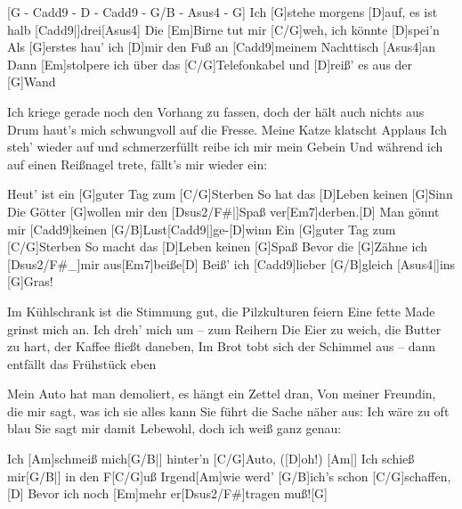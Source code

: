 


\begin{guitar}
	[G - Cadd9 - D - Cadd9 - G/B - Asus4 - G]{}
	Ich [G]stehe morgens [D]auf, es ist halb [Cadd9|]{drei}[Asus4]{}
	Die [Em]Birne tut mir [C/G]weh, ich könnte [D]spei'n
	Als [G]erstes hau' ich [D]mir den Fuß an [Cadd9]meinem Nachttisch [Asus4]an
	Dann [Em]stolpere ich über das [C/G]Telefonkabel und [D]reiß' es aus der [G]Wand
	
	Ich kriege gerade noch den Vorhang zu fassen, doch der hält auch nichts aus
	Drum haut's mich schwungvoll auf die Fresse. Meine Katze klatscht Applaus
	Ich steh' wieder auf und schmerzerfüllt reibe ich mir mein Gebein
	Und während ich auf einen Reißnagel trete, fällt's mir wieder ein:
	
	Heut' ist ein [G]guter Tag zum [C/G]Sterben
	So hat das [D]Leben keinen [G]Sinn
	Die Götter [G]wollen mir den [Dsus2/F#|]{Spaß} ver[Em7]derben.[D]{}
	Man gönnt mir [Cadd9]keinen [G/B]Lust[Cadd9|]{ge-}[D]winn
	Ein [G]guter Tag zum [C/G]Sterben
	So macht das [D]Leben keinen [G]Spaß
	Bevor die [G]Zähne ich [Dsus2/F#_]{mir aus}[Em7]beiße[D]{}
	Beiß' ich [Cadd9]lieber [G/B]gleich [Asus4|]{ins} [G]Gras!
	
	Im Kühlschrank ist die Stimmung gut, die Pilzkulturen feiern
	Eine fette Made grinst mich an. Ich dreh' mich um – zum Reihern
	Die Eier zu weich, die Butter zu hart, der Kaffee fließt daneben,
	Im Brot tobt sich der Schimmel aus – dann entfällt das Frühstück eben
	
	Mein Auto hat man demoliert, es hängt ein Zettel dran,
	Von meiner Freundin, die mir sagt, was ich sie alles kann
	Sie führt die Sache näher aus: Ich wäre zu oft blau
	Sie sagt mir damit Lebewohl, doch ich weiß ganz genau:
	
	 
	
	Ich [Am]schmeiß mich[G/B|] hinter'n [C/G]Auto, ([D]oh!)
	[Am|] Ich schieß mir[G/B|] in den F[C/G]uß
	Irgend[Am]wie werd' [G/B]ich's schon [C/G]schaffen,[D]{}
	Bevor ich noch [Em]mehr er[Dsus2/F#]tragen muß![G]{}
	

\end{guitar}

